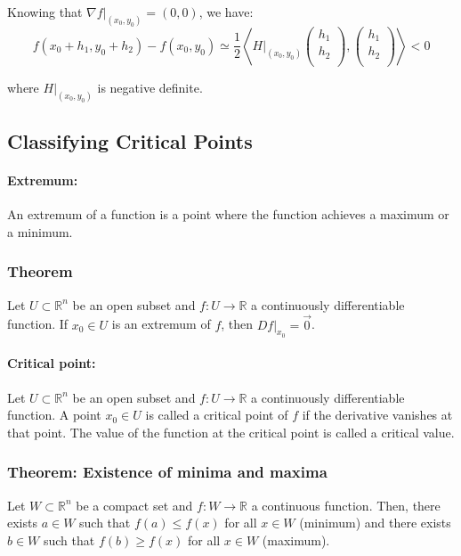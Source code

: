 \documentclass[11pt]{article}
\newcommand{\inner}[2]{\left\langle #1, #2 \right\rangle}
\begin{document}
Knowing that $\nabla f\big|_{(x_0,y_0)} = (0,0)$, we have:
\[
f(x_0 + h_1, y_0 + h_2) - f(x_0,y_0) \simeq \frac{1}{2} \inner{H\big|_{(x_0,y_0)}\begin{pmatrix}
    h_1 \\
    h_2 \\
\end{pmatrix}}{\begin{pmatrix}
    h_1 \\
    h_2 \\
\end{pmatrix}} < 0  
\]

where $H\big|_{(x_0,y_0)}$ is negative definite.

\subsection{Classifying Critical Points}
\paragraph{Extremum:} An extremum of a function is a point where the function achieves a maximum or a minimum.
\subsubsection{Theorem}
Let $U \subset \mathbb{R}^n$ be an open subset and $f : U \rightarrow \mathbb{R}$ a continuously differentiable function. If $x_0 \in U$ is an extremum of $f$, then $Df\big|_{x_0} = \overrightarrow{0}$.

\paragraph{Critical point:} Let $U \subset \mathbb{R}^n$ be an open subset and $f : U \rightarrow \mathbb{R}$ a continuously differentiable function. A point $x_0 \in U$ is called a critical point of $f$ if the derivative vanishes at that point. The value of the function at the critical point is called a critical value.

\subsubsection{Theorem: Existence of minima and maxima}
Let $W \subset \mathbb{R}^n$ be a compact set and $f : W \rightarrow \mathbb{R}$ a continuous function. Then, there exists $a \in W$ such that $f(a) \leq f(x)$ for all $x \in W$ (minimum) and there exists $b \in W$ such that $f(b) \geq f(x)$ for all $x \in W$ (maximum).
\end{document}
